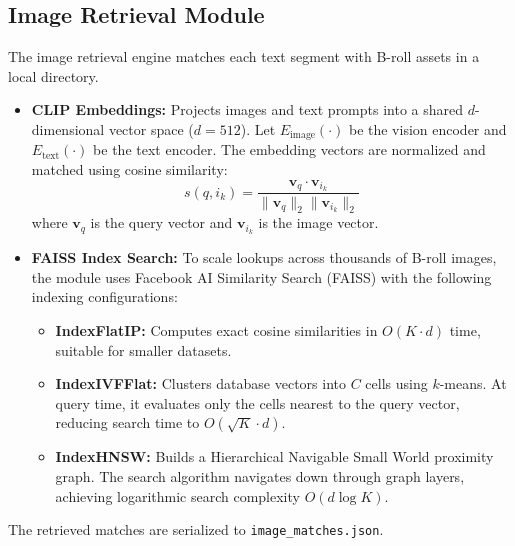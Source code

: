 \documentclass[a4paper,12pt]{report}
\begin{document}
\subsection{Image Retrieval Module}
The image retrieval engine matches each text segment with B-roll assets in a local directory.
\begin{itemize}
    \item \textbf{CLIP Embeddings:} Projects images and text prompts into a shared $d$-dimensional vector space ($d = 512$). Let $E_{\text{image}}(\cdot)$ be the vision encoder and $E_{\text{text}}(\cdot)$ be the text encoder. The embedding vectors are normalized and matched using cosine similarity:
    \begin{equation}
        s(q, i_k) = \frac{\mathbf{v}_q \cdot \mathbf{v}_{i_k}}{\|\mathbf{v}_q\|_2 \|\mathbf{v}_{i_k}\|_2}
    \end{equation}
    where $\mathbf{v}_q$ is the query vector and $\mathbf{v}_{i_k}$ is the image vector.
    \item \textbf{FAISS Index Search:} To scale lookups across thousands of B-roll images, the module uses Facebook AI Similarity Search (FAISS) with the following indexing configurations:
    \begin{itemize}
        \item \textbf{IndexFlatIP:} Computes exact cosine similarities in $O(K \cdot d)$ time, suitable for smaller datasets.
        \item \textbf{IndexIVFFlat:} Clusters database vectors into $C$ cells using $k$-means. At query time, it evaluates only the cells nearest to the query vector, reducing search time to $O(\sqrt{K} \cdot d)$.
        \item \textbf{IndexHNSW:} Builds a Hierarchical Navigable Small World proximity graph. The search algorithm navigates down through graph layers, achieving logarithmic search complexity $O(d \log K)$.
    \end{itemize}
\end{itemize}
The retrieved matches are serialized to \texttt{image\_matches.json}.
\end{document}
